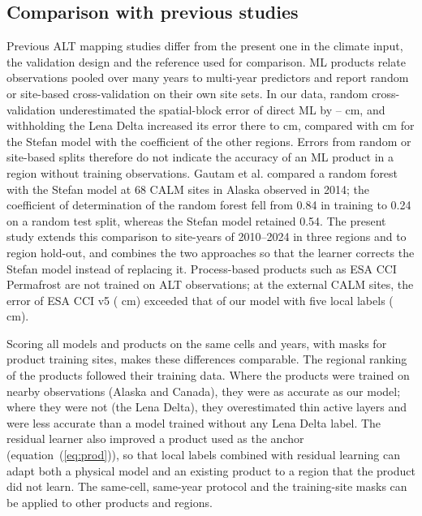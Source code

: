 \subsection{Comparison with previous studies}
Previous ALT mapping studies differ from the present one in the climate input, the validation design and the reference used for comparison. ML products relate observations pooled over many years to multi-year predictors and report random or site-based cross-validation on their own site sets\cite{Ran2022a,Liu2024,Wei2026}. In our data, random cross-validation underestimated the spatial-block error of direct ML by \noptimLeDz--\noptimCaDz{} cm, and withholding the Lena Delta increased its error there to \nrmseLeregDz{} cm, compared with \nrmseLeregPz{} cm for the Stefan model with the coefficient of the other regions. Errors from random or site-based splits therefore do not indicate the accuracy of an ML product in a region without training observations. Gautam et al.\cite{Gautam2025} compared a random forest with the Stefan model at 68 CALM sites in Alaska observed in 2014; the coefficient of determination of the random forest fell from 0.84 in training to 0.24 on a random test split, whereas the Stefan model retained 0.54. The present study extends this comparison to site-years of 2010--2024 in three regions and to region hold-out, and combines the two approaches so that the learner corrects the Stefan model instead of replacing it. Process-based products such as ESA CCI Permafrost are not trained on ALT observations\cite{Westermann2024,Westermann2025}; at the external CALM sites, the error of ESA CCI v5 (\nftAllCcifivezero{} cm) exceeded that of our model with five local labels (\nftAllRsfive{} cm).

Scoring all models and products on the same cells and years, with masks for product training sites, makes these differences comparable. The regional ranking of the products followed their training data. Where the products were trained on nearby observations (Alaska and Canada), they were as accurate as our model; where they were not (the Lena Delta), they overestimated thin active layers and were less accurate than a model trained without any Lena Delta label. The residual learner also improved a product used as the anchor (equation~(\ref{eq:prod})), so that local labels combined with residual learning can adapt both a physical model and an existing product to a region that the product did not learn. The same-cell, same-year protocol and the training-site masks can be applied to other products and regions.

